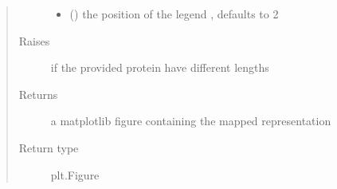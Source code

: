 \documentclass[letterpaper,10pt,english]{sphinxmanual}
\begin{document}
\begin{fulllineitems}
\begin{quote}
\begin{description}
\begin{itemize}
\item {} 
 (\sphinxstyleliteralemphasis{\sphinxupquote{, }}) \textendash{} the position of the legend , defaults to 2

\end{itemize}

\item[{Raises}] \leavevmode
{} \textendash{} if the provided protein have different lengths

\item[{Returns}] \leavevmode
a matplotlib figure containing the mapped representation

\item[{Return type}] \leavevmode
plt.Figure

\end{description}\end{quote}

\end{fulllineitems}

\end{document}
